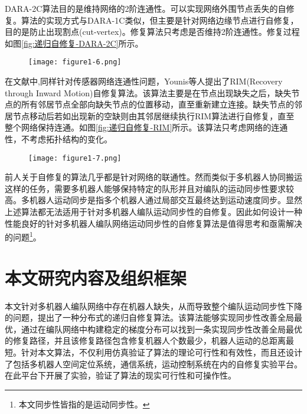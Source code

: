 DARA-2C算法目的是维持网络的2阶连通性。可以实现网络外围节点丢失的自修复。算法的实现方式与DARA-1C类似，但主要是针对网络边缘节点进行自修复，目的是防止出现割点(cut-vertex)。修复算法只考虑是否维持2阶连通性。修复过程如图\ref{fig:递归自修复-DARA-2C}所示。
\begin{figure}[!htbp]
	\centering
	\texttt{[image: figure1-6.png]}
\end{figure}

在文献\parencite{younis2010localized}中,同样针对传感器网络连通性问题，Younis等人提出了RIM(Recovery through Inward Motion)自修复算法。该算法主要是在节点出现缺失之后，缺失节点的所有邻居节点全部向缺失节点的位置移动，直至重新建立连接。缺失节点的邻居节点移动后若如出现新的空缺则由其邻居继续执行RIM算法进行自修复，直至整个网络保持连通。如图\ref{fig:递归自修复-RIM}所示。该算法只考虑网络的连通性，不考虑拓扑结构的变化。
\begin{figure}
	\centering
	\texttt{[image: figure1-7.png]}
\end{figure}

前人关于自修复的算法几乎都是针对网络的联通性。然而类似于多机器人协同搬运这样的任务，需要多机器人能够保持特定的队形并且对编队的运动同步性要求较高。多机器人运动同步是指多个机器人通过局部交互最终达到运动速度同步\supercite{张飞2008移动机器人覆盖问题的研究,Zhang2006Motion}。显然上述算法都无法适用于针对多机器人编队运动同步性的自修复。因此如何设计一种性能良好的针对多机器人编队网络运动同步性的自修复算法是值得思考和亟需解决的问题\footnote{本文同步性皆指的是运动同步性。}。

\section{本文研究内容及组织框架}
本文针对多机器人编队网络中存在机器人缺失，从而导致整个编队运动同步性下降的问题，提出了一种分布式的递归自修复算法。该算法能够实现同步性改善全局最优，通过在编队网络中构建稳定的梯度分布可以找到一条实现同步性改善全局最优的修复路径，并且该修复路径包含修复机器人个数最少，机器人运动的总距离最短。针对本文算法，不仅利用仿真验证了算法的理论可行性和有效性，而且还设计了包括多机器人空间定位系统，通信系统，运动控制系统在内的自修复实验平台。在此平台下开展了实验，验证了算法的现实可行性和可操作性。

